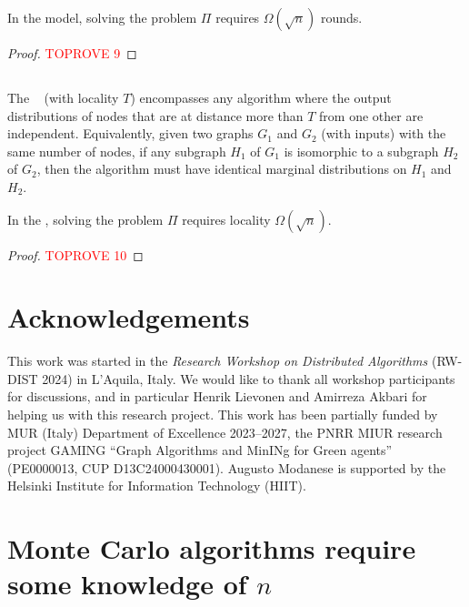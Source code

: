 \documentclass[11pt]{article}
\begin{document}
\begin{theorem}\label{thm:lb-detolcl}
	In the \detolcl model, solving the problem $\Pi$ requires $\Omega(\sqrt{n})$
	rounds.
\end{theorem}
\begin{proof}\textcolor{red}{TOPROVE 9}\end{proof}


\subsection{\Boundep}\label{sec:boundep}

The \boundep~\cite{akbari24_online_arxiv} (with locality $T$)
encompasses any algorithm where the output distributions of nodes that are at
distance more than $T$ from one other are independent.
Equivalently, given two graphs $G_1$ and $G_2$ (with inputs) with the same
number of nodes, if any subgraph $H_1$ of $G_1$ is isomorphic to a subgraph
$H_2$ of $G_2$, then the algorithm must have identical marginal distributions on
$H_1$ and $H_2$.

\begin{theorem}\label{thm:lb-boundep}
	In the \boundep, solving the problem $\Pi$ requires locality $\Omega(\sqrt{n})$.
\end{theorem}
\begin{proof}\textcolor{red}{TOPROVE 10}\end{proof}


\ifanon\else
\section*{Acknowledgements}

This work was started in the \emph{Research Workshop on Distributed Algorithms} (RW-DIST 2024) in L'Aquila, Italy. We would like to thank all workshop participants for discussions, and in particular Henrik Lievonen and Amirreza Akbari for helping us with this research project. This work has been partially funded by MUR (Italy) Department of Excellence 2023--2027, the PNRR MIUR research project GAMING ``Graph Algorithms and MinINg for Green agents'' (PE0000013, CUP D13C24000430001). Augusto Modanese is supported by the Helsinki Institute for Information Technology (HIIT).

\fi 


\printbibliography

\newpage
\appendix

\section{Monte Carlo algorithms require some knowledge of \texorpdfstring{\boldmath$n$}{n}}
\label{appx:monte-carlo}
\end{document}
